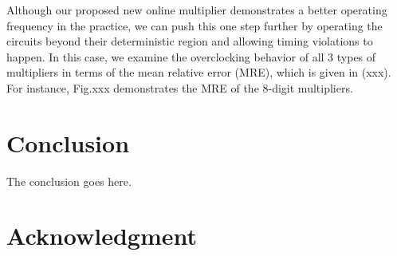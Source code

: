 \documentclass[conference]{IEEEtran}
\begin{document}
Although our proposed new online multiplier demonstrates a better operating frequency in the practice, we can push this one step further by operating the circuits beyond their deterministic region and allowing timing violations to happen. In this case, we examine the overclocking behavior of all 3 types of multipliers in terms of the mean relative error (MRE), which is given in (xxx). For instance, Fig.xxx demonstrates the MRE of the 8-digit multipliers.




%



\section{Conclusion}
The conclusion goes here.





\section*{Acknowledgment}








%


\end{document}
